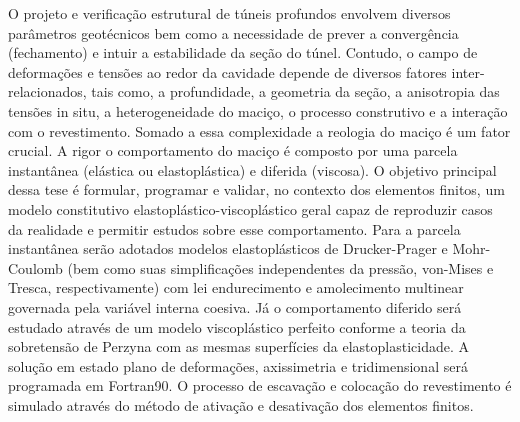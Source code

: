 O projeto e verificação estrutural de túneis profundos envolvem diversos parâmetros geotécnicos bem como a necessidade de prever a convergência (fechamento) e intuir a estabilidade da seção do túnel. Contudo, o campo de deformações e tensões ao redor da cavidade depende de diversos fatores inter-relacionados, tais como, a profundidade, a geometria da seção, a anisotropia das tensões in situ, a heterogeneidade do maciço, o processo construtivo e a interação com o revestimento. Somado a essa complexidade a reologia do maciço é um fator crucial. A rigor o comportamento do maciço é composto por uma parcela instantânea (elástica ou elastoplástica) e diferida (viscosa). O objetivo principal dessa tese é formular, programar e validar, no contexto dos elementos finitos, um modelo constitutivo elastoplástico-viscoplástico geral capaz de reproduzir casos da realidade e permitir estudos sobre esse comportamento. Para a parcela instantânea serão adotados modelos elastoplásticos de Drucker-Prager e Mohr-Coulomb (bem como suas simplificações independentes da pressão, von-Mises e Tresca, respectivamente) com lei endurecimento e amolecimento multinear governada pela variável interna coesiva. Já o comportamento diferido será estudado através de um modelo viscoplástico perfeito conforme a teoria da sobretensão de Perzyna com as mesmas superfícies da elastoplasticidade. A solução em estado plano de deformações, axissimetria e tridimensional será programada em Fortran90. O processo de escavação e colocação do revestimento é simulado através do método de ativação e desativação dos elementos finitos.